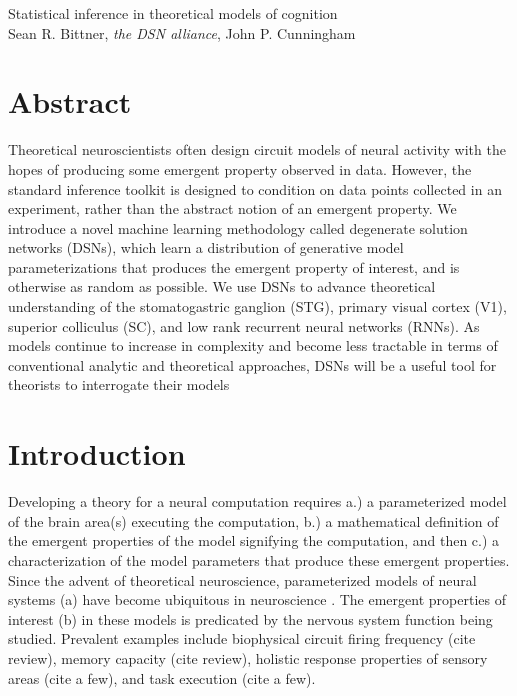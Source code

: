 \documentclass[11pt]{article}
\begin{document}
\medskip                        %

\thispagestyle{plain}
{\Large Statistical inference in theoretical models of cognition} \\
Sean R. Bittner, \textit{the DSN alliance}, John P. Cunningham
\section{Abstract}
Theoretical neuroscientists often design circuit models of neural activity with the hopes of producing some emergent property observed in data.  However, the standard inference toolkit is designed to condition on data points collected in an experiment, rather than the abstract notion of an emergent property.  We introduce a novel machine learning methodology called degenerate solution networks (DSNs), which learn a distribution of generative model parameterizations that produces the emergent property of interest, and is otherwise as random as possible.  We use DSNs to advance theoretical understanding of the stomatogastric ganglion (STG), primary visual cortex (V1), superior colliculus (SC), and low rank recurrent neural networks (RNNs).  As models continue to increase in complexity and become less tractable in terms of conventional analytic and theoretical approaches, DSNs will be a useful tool for theorists to interrogate their models

\section{Introduction}
Developing a theory for a neural computation requires a.) a parameterized model of the brain area(s) executing the computation, b.) a mathematical definition of the emergent properties of the model signifying the computation, and then c.) a characterization of the model parameters that produce these emergent properties.  Since the advent of theoretical neuroscience, parameterized models of neural systems (a) have become ubiquitous in neuroscience \cite{abbott2008theoretical}.  The emergent properties of interest (b) in these models is predicated by the nervous system function being studied.  Prevalent examples include biophysical circuit firing frequency (cite review), memory capacity (cite review), holistic response properties of sensory areas (cite a few), and task execution (cite a few).
\end{document}
